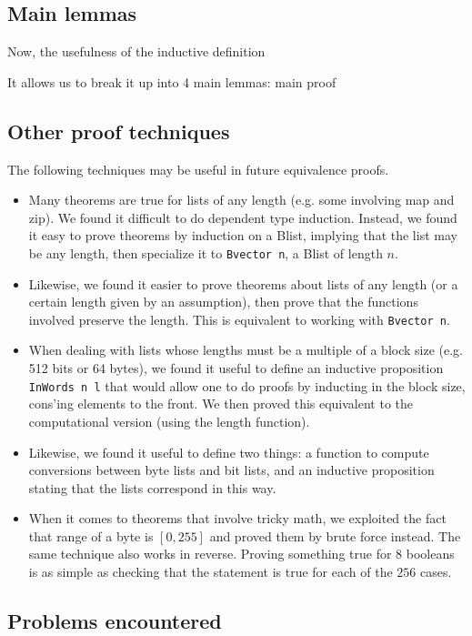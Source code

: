 \documentclass[twocolumn,showpacs,%
  nofootinbib,aps,superscriptaddress,%
  eqsecnum,prd,notitlepage,showkeys,10pt]{revtex4-1}
\begin{document}
\subsection{Main lemmas}

Now, the usefulness of the inductive definition

It allows us to break it up into 4 main lemmas: main proof

\subsection{Other proof techniques}

The following techniques may be useful in future equivalence proofs.

\begin{itemize}
\item Many theorems are true for lists of any length (e.g. some involving map and zip). We found it difficult to do dependent type induction. Instead, we found it easy to prove theorems by induction on a Blist, implying that the list may be any length, then specialize it to \verb|Bvector n|, a Blist of length $n$. 
\item Likewise, we found it easier to prove theorems about lists of any length (or a certain length given by an assumption), then prove that the functions involved preserve the length. This is equivalent to working with \verb|Bvector n|.
\item When dealing with lists whose lengths must be a multiple of a block size (e.g. 512 bits or 64 bytes), we found it useful to define an inductive proposition \verb|InWords n l| that would allow one to do proofs by inducting in the block size, cons'ing elements to the front. We then proved this equivalent to the computational version (using the length function).
\item Likewise, we found it useful to define two things: a function to compute conversions between byte lists and bit lists, and an inductive proposition stating that the lists correspond in this way.
\item When it comes to theorems that involve tricky math, we exploited the fact that range of a byte is $[0, 255]$ and proved them by brute force instead. The same technique also works in reverse. Proving something true for $8$ booleans is as simple as checking that the statement is true for each of the $256$ cases.
\end{itemize}

\subsection{Problems encountered}
\end{document}
